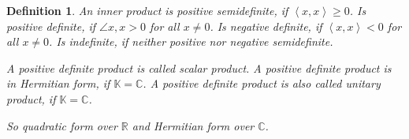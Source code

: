 \documentclass{article}
\newtheorem{definition}{Definition}  \numberwithin{definition}{section}
\newcommand{\angel}[1]{\left\langle#1\right\rangle}
\begin{document}
\begin{definition}
  An inner product is \emph{positive semidefinite}, if $\angel{x, x} \geq 0$.
  Is \emph{positive definite}, if $\angle{x, x} > 0$ for all $x \neq 0$.
  Is \emph{negative definite}, if $\angel{x, x} < 0$ for all $x \neq 0$.
  Is \emph{indefinite}, if neither positive nor negative semidefinite.

  A positive definite product is called \emph{scalar product}.
  A positive definite product is in \emph{Hermitian form}, if $\mathbb K = \mathbb C$.
  A positive definite product is also called \emph{unitary product}, if $\mathbb K = \mathbb C$.

  So quadratic form over $\mathbb R$ and Hermitian form over $\mathbb C$.
\end{definition}
\end{document}
